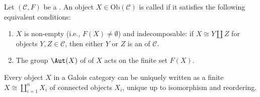 \begin{definition} \label{definition:connected_object_of_a_galois_category}
Let $(\mathcal{C}, F)$ be a . An object $X \in \mathrm{Ob}(\mathcal{C})$ is called  if it satisfies the following equivalent conditions:

\begin{enumerate}
    \item $X$ is non-empty (i.e., $F(X) \neq \emptyset$) and indecomposable: if $X \cong Y \amalg Z$ for objects $Y, Z \in \mathcal{C}$, then either $Y$ or $Z$ is an  of $\mathcal{C}$.

    \item The group $\Aut(X)$ of  of $X$ acts  on the finite set $F(X)$.
\end{enumerate}

Every object $X$ in a Galois category can be uniquely written as a finite  $X \cong \coprod_{i=1}^n X_i$ of connected objects $X_i$, unique up to isomorphism and reordering.
\end{definition}
